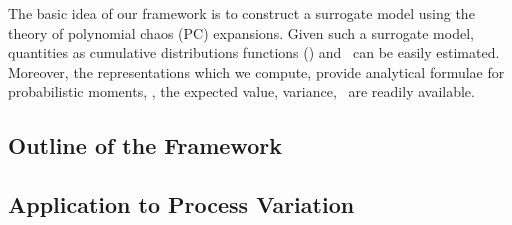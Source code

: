 The basic idea of our framework is to construct a surrogate model using the theory of polynomial chaos (PC) expansions. Given such a surrogate model, quantities as cumulative distributions functions (\cdfs) and \pdfs\ can be easily estimated. Moreover, the representations which we compute, provide analytical formulae for probabilistic moments, \ie, the expected value, variance, \etc\ are readily available.

\subsection{Outline of the Framework}


\subsection{Application to Process Variation} 

